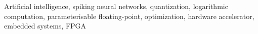 \begin{keywords}
Artificial intelligence, spiking neural networks, quantization, logarithmic computation, parameterisable floating-point, optimization, hardware accelerator, embedded systems, FPGA
\end{keywords}

\titlepgskip=-15pt

\maketitle
